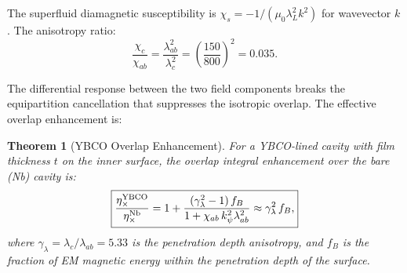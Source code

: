 \documentclass[11pt]{article}
\newtheorem{theorem}{Theorem}
\begin{document}
The superfluid diamagnetic susceptibility is
$\chi_s = -1/(\mu_0\lambda_L^2 k^2)$ for wavevector $k$.
The anisotropy ratio:
\begin{equation}
\frac{\chi_c}{\chi_{ab}} = \frac{\lambda_{ab}^2}{\lambda_c^2}
= \left(\frac{150}{800}\right)^2 = 0.035.
\end{equation}

The differential response between the two field components
breaks the equipartition cancellation that suppresses the isotropic
overlap. The effective overlap enhancement is:

\begin{theorem}[YBCO Overlap Enhancement]
\label{thm:ybco-overlap}
For a YBCO-lined cavity with film thickness $t$ on the inner surface,
the overlap integral enhancement over the bare (Nb) cavity is:
\begin{equation}
\boxed{\frac{\eta_\times^{\rm YBCO}}{\eta_\times^{\rm Nb}}
= 1 + \frac{(\gamma_\lambda^2 - 1)\,f_B}{1 + \chi_{ab}\,k_\psi^2\lambda_{ab}^2}
\approx \gamma_\lambda^2\,f_B,}
\label{eq:ybco-enhancement}
\end{equation}
where $\gamma_\lambda = \lambda_c/\lambda_{ab} = 5.33$ is the
penetration depth anisotropy, and $f_B$ is the fraction of EM
magnetic energy within the penetration depth of the surface.
\end{theorem}
\end{document}
